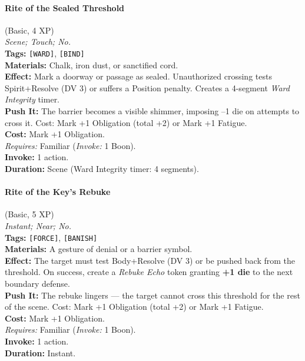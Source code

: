 \paragraph{Rite of the Sealed Threshold} (Basic, 4 XP) \hfill \\
\emph{Scene; Touch; No.} \\
\textbf{Tags:} \texttt{[WARD]}, \texttt{[BIND]} \\
\textbf{Materials:} Chalk, iron dust, or sanctified cord. \\
\textbf{Effect:} Mark a doorway or passage as sealed. Unauthorized crossing tests Spirit+Resolve (DV 3) or suffers a Position penalty. Creates a 4-segment \textit{Ward Integrity} timer. \\
\textbf{Push It:} The barrier becomes a visible shimmer, imposing --1 die on attempts to cross it. Cost: Mark +1 Obligation (total +2) or Mark +1 Fatigue. \\
\textbf{Cost:} Mark +1 Obligation. \\
\textit{Requires:} Familiar (\textit{Invoke:} 1 Boon). \\
\textbf{Invoke:} 1 action. \\
\textbf{Duration:} Scene (Ward Integrity timer: 4 segments).

\paragraph{Rite of the Key's Rebuke} (Basic, 5 XP) \hfill \\
\emph{Instant; Near; No.} \\
\textbf{Tags:} \texttt{[FORCE]}, \texttt{[BANISH]} \\
\textbf{Materials:} A gesture of denial or a barrier symbol. \\
\textbf{Effect:} The target must test Body+Resolve (DV 3) or be pushed back from the threshold. On success, create a \textit{Rebuke Echo} token granting \textbf{+1 die} to the next boundary defense. \\
\textbf{Push It:} The rebuke lingers --- the target cannot cross this threshold for the rest of the scene. Cost: Mark +1 Obligation (total +2) or Mark +1 Fatigue. \\
\textbf{Cost:} Mark +1 Obligation. \\
\textit{Requires:} Familiar (\textit{Invoke:} 1 Boon). \\
\textbf{Invoke:} 1 action. \\
\textbf{Duration:} Instant.

